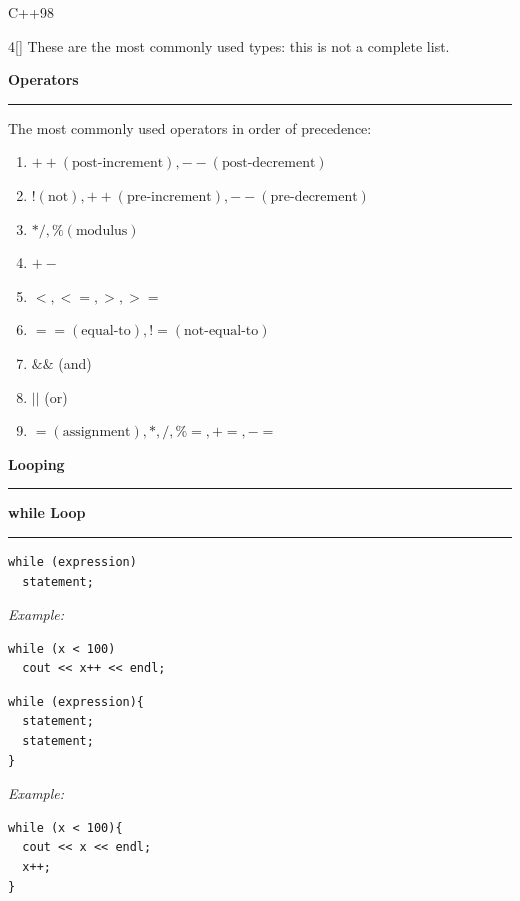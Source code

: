 \documentclass[final]{beamer}
\renewcommand{\section}[1]{%
  \par\vspace{1em}%
  {\noindent\Large\bfseries #1\par}%
  \vspace{0.5em}\hrule\vspace{1em}%
}
\renewcommand{\subsection}[1]{%
  \par\vspace{1em}%
  {\noindent\large\bfseries #1\par}%
  \vspace{0.5em}\hrule\vspace{1em}%
}
\begin{document}
\begin{frame}[t,fragile]{C++98}
\begin{multicols}{4}[\setlength{\columnsep}{1.5cm}]
These are the most commonly used types: this is not a complete list.

 
\section{Operators}
The most commonly used operators in order of precedence:
\begin{enumerate}
    \item $++(\text{post-increment}), --(\text{post-decrement})$
    \item $!(\text{not}), ++ (\text{pre-increment}), -- (\text{pre-decrement})$
    \item $* / , \% (\text{modulus})$
    \item $+-$
    \item $<, <=, >, >=\text{}$
    \item $==(\text{equal-to}), != (\text{not-equal-to})$
    \item $\&\&$ (and)
    \item $||$ (or)
    \item $= (\text{assignment}), * , / , \%= , +=, -= $
\end{enumerate}


\section{Looping}

 
\subsection{while Loop}
\begin{lstlisting}
while (expression)
  statement;
\end{lstlisting}
{\it Example:}
\begin{lstlisting}
while (x < 100)
  cout << x++ << endl;
\end{lstlisting}
\begin{lstlisting}
while (expression){
  statement;
  statement;
}
\end{lstlisting}
{\it Example:}
\begin{lstlisting}
while (x < 100){
  cout << x << endl;
  x++;
}
\end{lstlisting}


\end{multicols}
\end{frame}
\end{document}
